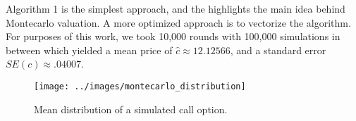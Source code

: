 \documentclass[../TGMAFFIRO.tex]{subfiles}
\begin{document}
\hfill \break
Algorithm 1 is the simplest approach, and the highlights the main idea behind Montecarlo valuation. A more optimized approach is to vectorize the algorithm. For purposes of this work, we took 10,000 rounds with 100,000 simulations in between which yielded a mean price of $\hat c \approx 12.12566$, and a standard error $SE(c) \approx .04007$.

\begin{figure}[h]
	\centering
  \texttt{[image: ../images/montecarlo\_distribution]}
  \caption{Mean distribution of a simulated call option.}
\end{figure}
\end{document}
